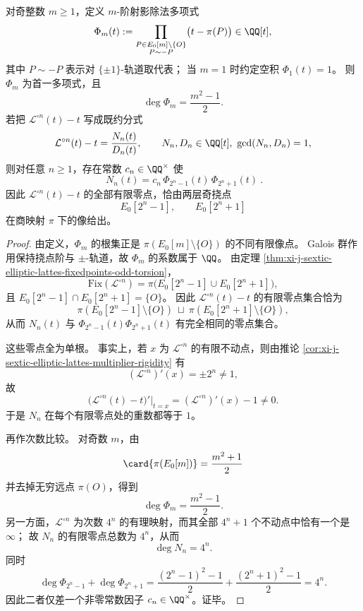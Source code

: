 \begin{theorem}[迭代不动点方程的射影除法多项式分解]\label{thm:xi-j-sextic-elliptic-lattes-projective-division-factorization}
对奇整数 \(m\ge 1\)，定义 \(m\)-阶射影除法多项式
\[
\Phi_m(t):=
\prod_{\substack{P\in E_0[m]\setminus\{O\}\\ P\sim -P}}
\bigl(t-\pi(P)\bigr)\in \QQ[t],
\]
其中 \(P\sim -P\) 表示对 \(\{\pm1\}\)-轨道取代表；
当 \(m=1\) 时约定空积 \(\Phi_1(t)=1\)。
则 \(\Phi_m\) 为首一多项式，且
\[
\deg \Phi_m=\frac{m^2-1}{2}.
\]
若把 \(\mathcal L^{\circ n}(t)-t\) 写成既约分式
\[
\mathcal L^{\circ n}(t)-t=\frac{N_n(t)}{D_n(t)},
\qquad N_n,D_n\in\QQ[t],\ \gcd(N_n,D_n)=1,
\]
则对任意 \(n\ge 1\)，存在常数 \(c_n\in\QQ^\times\) 使
\[
\boxed{\ N_n(t)=c_n\,\Phi_{2^n-1}(t)\,\Phi_{2^n+1}(t)\ }.
\]
因此 \(\mathcal L^{\circ n}(t)-t\) 的全部有限零点，恰由两层奇挠点
\[
E_0[2^n-1],\qquad E_0[2^n+1]
\]
在商映射 \(\pi\) 下的像给出。
\end{theorem}
\begin{proof}
由定义，\(\Phi_m\) 的根集正是 \(\pi(E_0[m]\setminus\{O\})\) 的不同有限像点。
Galois 群作用保持挠点阶与 \(\pm\)-轨道，故 \(\Phi_m\) 的系数属于 \(\QQ\)。
由定理 \ref{thm:xi-j-sextic-elliptic-lattes-fixedpoints-odd-torsion}，
\[
\mathrm{Fix}(\mathcal L^{\circ n})
=\pi\bigl(E_0[2^n-1]\cup E_0[2^n+1]\bigr),
\]
且 \(E_0[2^n-1]\cap E_0[2^n+1]=\{O\}\)。
因此 \(\mathcal L^{\circ n}(t)-t\) 的有限零点集合恰为
\[
\pi(E_0[2^n-1]\setminus\{O\})\ \sqcup\ \pi(E_0[2^n+1]\setminus\{O\}),
\]
从而 \(N_n(t)\) 与 \(\Phi_{2^n-1}(t)\Phi_{2^n+1}(t)\) 有完全相同的零点集合。
\par
这些零点全为单根。
事实上，若 \(x\) 为 \(\mathcal L^{\circ n}\) 的有限不动点，则由推论
\ref{cor:xi-j-sextic-elliptic-lattes-multiplier-rigidity}
有
\[
(\mathcal L^{\circ n})'(x)=\pm 2^n\neq 1,
\]
故
\[
\bigl(\mathcal L^{\circ n}(t)-t\bigr)'|_{t=x}
=(\mathcal L^{\circ n})'(x)-1\neq 0.
\]
于是 \(N_n\) 在每个有限零点处的重数都等于 \(1\)。
\par
再作次数比较。
对奇数 \(m\)，由
\[
\card{\pi(E_0[m])}=\frac{m^2+1}{2}
\]
并去掉无穷远点 \(\pi(O)\)，得到
\[
\deg \Phi_m=\frac{m^2-1}{2}.
\]
另一方面，\(\mathcal L^{\circ n}\) 为次数 \(4^n\) 的有理映射，而其全部 \(4^n+1\) 个不动点中恰有一个是 \(\infty\)；
故 \(N_n\) 的有限零点总数为 \(4^n\)，从而
\[
\deg N_n=4^n.
\]
同时
\[
\deg \Phi_{2^n-1}+\deg \Phi_{2^n+1}
=\frac{(2^n-1)^2-1}{2}+\frac{(2^n+1)^2-1}{2}
=4^n.
\]
因此二者仅差一个非零常数因子 \(c_n\in\QQ^\times\)。证毕。
\end{proof}
